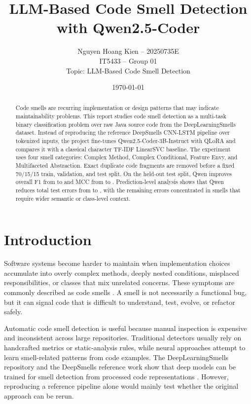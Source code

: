\documentclass[11pt,a4paper]{article}
\title{LLM-Based Code Smell Detection with Qwen2.5-Coder}
\author{
Nguyen Hoang Kien -- 20250735E\\
IT5433 -- Group 01\\
Topic: LLM-Based Code Smell Detection
}
\date{\today}
\begin{document}
\maketitle

\begin{abstract}
Code smells are recurring implementation or design patterns that may indicate maintainability problems. This report studies code smell detection as a multi-task binary classification problem over raw Java source code from the DeepLearningSmells dataset. Instead of reproducing the reference DeepSmells CNN-LSTM pipeline over tokenized inputs, the project fine-tunes Qwen2.5-Coder-3B-Instruct with QLoRA and compares it with a classical character TF-IDF LinearSVC baseline. The experiment uses four smell categories: Complex Method, Complex Conditional, Feature Envy, and Multifaceted Abstraction. Exact duplicate code fragments are removed before a fixed 70/15/15 train, validation, and test split. On the held-out test split, Qwen improves overall F1 from \baselinefione{} to \qwenfione{} and MCC from \baselinemcc{} to \qwenmcc{}. Prediction-level analysis shows that Qwen reduces total test errors from \baselineerrors{} to \qwenerrors{}, with the remaining errors concentrated in smells that require wider semantic or class-level context.
\end{abstract}

\section{Introduction}
Software systems become harder to maintain when implementation choices accumulate into overly complex methods, deeply nested conditions, misplaced responsibilities, or classes that mix unrelated concerns. These symptoms are commonly described as code smells \cite{fowler1999refactoring}. A smell is not necessarily a functional bug, but it can signal code that is difficult to understand, test, evolve, or refactor safely.

Automatic code smell detection is useful because manual inspection is expensive and inconsistent across large repositories. Traditional detectors usually rely on handcrafted metrics or static-analysis rules, while neural approaches attempt to learn smell-related patterns from code examples. The DeepLearningSmells repository and the DeepSmells reference work show that deep models can be trained for smell detection from processed code representations \cite{deeplearningsmells,deepsmells}. However, reproducing a reference pipeline alone would mainly test whether the original approach can be rerun.
\end{document}
